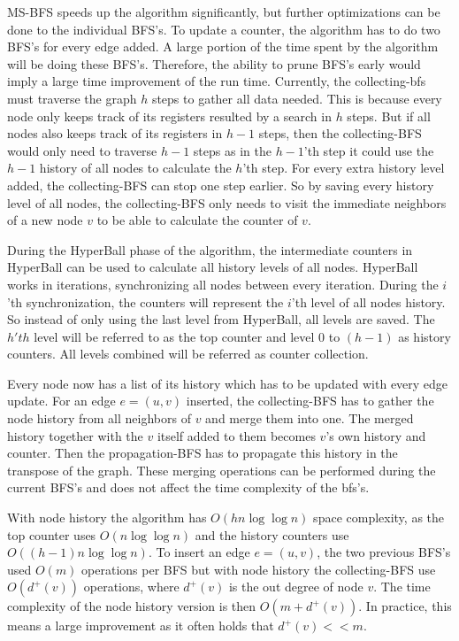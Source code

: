 MS-BFS speeds up the algorithm significantly, but further optimizations can be done to the individual BFS's. To update a counter, the algorithm has to do two BFS's for every edge added. A large portion of the time spent by the algorithm will be doing these BFS's. Therefore, the ability to prune BFS's early would imply a large time improvement of the run time. Currently, the collecting-bfs must traverse the graph $h$ steps to gather all data needed. This is because every node only keeps track of its registers resulted by a search in $h$ steps. But if all nodes also keeps track of its registers in $h-1$ steps, then the collecting-BFS would only need to traverse $h-1$ steps as in the $h-1$'th step it could use the $h-1$ history of all nodes to calculate the $h$'th step. For every extra history level added, the collecting-BFS can stop one step earlier. So by saving every history level of all nodes, the collecting-BFS only needs to visit the immediate neighbors of a new node $v$ to be able to calculate the counter of $v$. 

During the HyperBall phase of the algorithm, the intermediate counters in HyperBall can be used to calculate all history levels of all nodes. HyperBall works in iterations, synchronizing all nodes between every iteration. During the $i$'th synchronization, the counters will represent the $i$'th level of all nodes history. So instead of only using the last level from HyperBall, all levels are saved. The $h'th$ level will be referred to as the top counter and level $0$ to $(h-1)$ as history counters. All levels combined will be referred as counter collection.  

Every node now has a list of its history which has to be updated with every edge update. For an edge $e = (u,v)$ inserted, the collecting-BFS has to gather the node history from all neighbors of $v$ and merge them into one. The merged history together with the $v$ itself added to them becomes $v$'s own history and counter. Then the propagation-BFS has to propagate this history in the transpose of the graph. These merging operations can be performed during the current BFS's and does not affect the time complexity of the bfs's.

With node history the algorithm has $O(hn \log \log n)$ space complexity, as the top counter uses $O(n \log \log n)$ and the history counters use $O((h-1)n \log \log n)$. To insert an edge $e = (u,v)$, the two previous BFS's used $O(m)$ operations per BFS but with node history the collecting-BFS use $O(d^+(v))$ operations, where $d^+(v)$ is the out degree of node $v$. The time complexity of the node history version is then $O(m + d^+(v))$. In practice, this means a large improvement as it often holds that $d^+(v) << m$.

